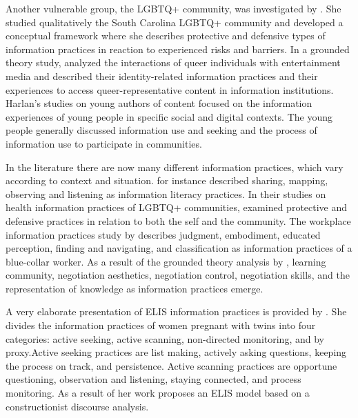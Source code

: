 \documentclass[12pt, a4paper, titlepage, oneside, abstract=true, toc=listof, toc=bibliography, BCOR=1cm]{scrreprt}
\begin{document}
Another vulnerable group, the LGBTQ+ community, was investigated by \citet{Kitzie2020}. She studied qualitatively the South Carolina LGBTQ+ community and developed a conceptual framework where she describes protective and defensive types of information practices in reaction to experienced risks and barriers. In a grounded theory study, \citet{Floegel2019} analyzed the interactions of queer individuals with entertainment media and described their identity-related information practices and their experiences to access queer-representative content in information institutions. Harlan's studies \citep{Harlan2012, Harlan2012a, Harlan2014} on young authors of content focused on the information experiences of young people in specific social and digital contexts. The young people generally discussed information use and seeking and the process of information use to participate in communities. 

In the literature there are now many different information practices, which vary according to context and situation. \citet{Lloyd2013} for instance described sharing, mapping, observing and listening as information literacy practices. In their studies on health information practices of LGBTQ+ communities, \citet{Kitzie2020} examined protective and defensive practices in relation to both the self and the community. The workplace information practices study by \citet{Veinot2007} describes judgment, embodiment, educated perception, finding and navigating, and classification as information practices of a blue-collar worker. As a result of the grounded theory analysis by \citet{Harlan2012}, learning community, negotiation aesthetics, negotiation control, negotiation skills, and the representation of knowledge as information practices emerge.

A very elaborate presentation of ELIS information practices is provided by \citet{McKenzie2002, McKenzie2003}. She divides the information practices of women pregnant with twins into four categories: active seeking, active scanning, non-directed monitoring, and by proxy.Active seeking practices are list making, actively asking questions, keeping the process on track, and persistence.  Active scanning practices are opportune questioning, observation and listening, staying connected, and process monitoring. As a result of her work \citet{McKenzie2003a} proposes an ELIS model based on a constructionist discourse analysis.
\end{document}
